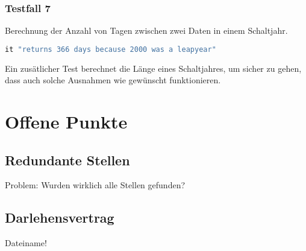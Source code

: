 \documentclass[12pt]{scrreprt}
\begin{document}
\subsubsection{Testfall 7}
Berechnung der Anzahl von Tagen zwischen zwei Daten in einem Schaltjahr.
\begin{lstlisting}[language=Ruby]
it "returns 366 days because 2000 was a leapyear"
\end{lstlisting}
Ein zusätlicher Test berechnet die Länge eines Schaltjahres, um sicher zu gehen, dass auch solche Ausnahmen wie gewünscht funktionieren.

\section{Offene Punkte}
\subsection{Redundante Stellen}
Problem: Wurden wirklich alle Stellen gefunden?
\subsection{Darlehensvertrag} Dateiname!
\end{document}
